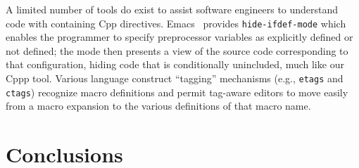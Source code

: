 \documentclass[10pt]{article}
\begin{document}



A limited number of tools do exist to assist software engineers to
understand code with containing Cpp directives.  Emacs~\cite{GNUEmacs19.26}
provides \texttt{hide-ifdef-mode} which enables the programmer to specify
preprocessor variables as explicitly defined or not defined; the mode then
presents a view of the source code corresponding to that configuration,
hiding code that is conditionally unincluded, much like our Cppp tool.
Various language construct ``tagging'' mechanisms (e.g., \texttt{etags} and
\texttt{ctags}) recognize macro definitions and permit tag-aware editors
to move easily from a macro expansion to the various definitions of that
macro name.


\section{Conclusions}
\label{sec:conclusion}
\end{document}
